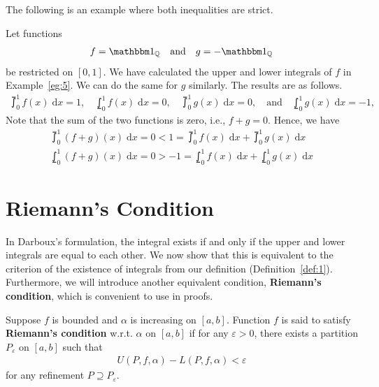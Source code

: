 \documentclass[thmcnt=section, 12pt]{my-elegantbook}
\begin{document}
The following is an example where both inequalities are strict.

\begin{example}
    Let functions
    \begin{align*}
        f = \ind_\Q 
        \quad \text{and} \quad 
        g = -\ind_\Q
    \end{align*}
    be restricted on $[0, 1]$. We have calculated the upper and lower integrals of $f$ in Example~\ref{eg:5}. We can do the same for $g$ similarly. The results are as follows.
    \begin{align*}
        \upint_0^1 f(x) \; \mathrm{d}x = 1,
        \quad 
        \lowint_0^1 f(x) \; \mathrm{d}x = 0,
        \quad
        \upint_0^1 g(x) \; \mathrm{d}x = 0,
        \quad \text{and} \quad
        \lowint_0^1 g(x) \; \mathrm{d}x = -1,
    \end{align*}
    Note that the sum of the two functions is zero, i.e., $f + g = 0$. Hence, we have
    \begin{align*}
        \upint_0^1 (f+g)(x) \; \mathrm{d}x 
        = 0 
        < 1 
        = \upint_0^1 f(x) \; \mathrm{d}x + \upint_0^1 g(x) \; \mathrm{d}x \\
        \lowint_0^1 (f+g)(x) \; \mathrm{d}x 
        = 0
        > -1 
        = \lowint_0^1 f(x) \; \mathrm{d}x + \lowint_0^1 g(x) \; \mathrm{d}x
    \end{align*}
\end{example}


\section{Riemann's Condition}

In Darboux's formulation, the integral exists if and only if the upper and lower integrals are equal to each other. We now show that this is equivalent to the criterion of the existence of integrals from our definition (Definition~\ref{def:1}). Furthermore, we will introduce another equivalent condition, \textbf{Riemann's condition}, which is convenient to use in proofs.

\begin{definition}
    Suppose $f$ is bounded and $\alpha$ is increasing on $[a, b]$. Function $f$ is said to satisfy \textbf{Riemann's condition} w.r.t. $\alpha$ on $[a, b]$ if for any $\varepsilon > 0$, there exists a partition $P_\varepsilon$ on $[a, b]$ such that 
    \begin{align*}
        U(P,f,\alpha) - L(P,f,\alpha) < \varepsilon
    \end{align*}
    for any refinement $P \supseteq P_\varepsilon$.
\end{definition}
\end{document}
